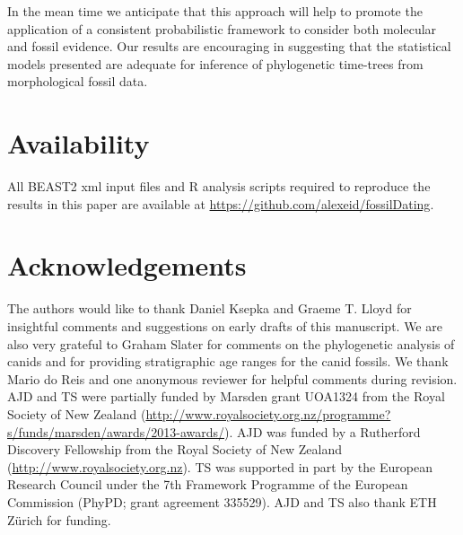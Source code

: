 \documentclass[11pt]{article}
\begin{document}
In the mean time we anticipate that this approach will help to promote the application of a consistent probabilistic framework to consider both molecular and fossil evidence. Our results are encouraging in suggesting that the statistical models presented are adequate for inference of phylogenetic time-trees from morphological fossil data.

\section*{Availability}

All BEAST2 xml input files and R analysis scripts required to reproduce the results in this paper are available at \url{https://github.com/alexeid/fossilDating}.

\section*{Acknowledgements}

The authors would like to thank Daniel Ksepka and Graeme T. Lloyd for insightful comments and suggestions on early drafts of this manuscript. %
We are also very grateful to Graham Slater for comments on the phylogenetic analysis of canids and for providing stratigraphic age ranges for the canid fossils. We thank Mario do Reis and one anonymous reviewer for helpful comments during revision.
AJD and TS were partially funded by Marsden grant UOA1324 from the Royal Society of New Zealand (\url{http://www.royalsociety.org.nz/programme?s/funds/marsden/awards/2013-awards/}). AJD was funded by a Rutherford Discovery Fellowship from the Royal Society of New Zealand (\url{http://www.royalsociety.org.nz}).  TS was supported in part by the European Research Council under the 7th Framework Programme of the European Commission (PhyPD; grant agreement 335529). AJD and TS also thank ETH Z\"{u}rich for funding.




\end{document}
